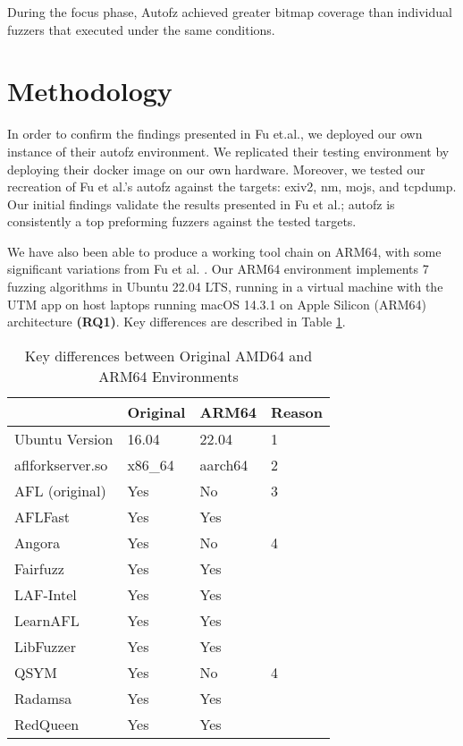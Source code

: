 During the focus phase, Autofz achieved greater bitmap coverage than individual fuzzers that executed under the same conditions.
\cite{Fu}

\section{Methodology}
In order to confirm the findings presented in Fu et.al.\cite{Fu}, we deployed our own instance of
their autofz environment. We replicated their testing environment by deploying their docker image
on our own hardware. Moreover, we tested our recreation of Fu et al.'s autofz against the targets:
exiv2, nm, mojs, and tcpdump. Our initial findings validate the results presented in Fu et al.;
autofz is consistently a top preforming fuzzers against the tested targets.

We have also been able to produce a working tool chain on ARM64, with some significant variations
from Fu et al. \cite{Fu}. Our ARM64 environment implements 7 fuzzing algorithms in
Ubuntu 22.04 LTS, running in a virtual machine with the UTM app on host laptops running
macOS 14.3.1 on Apple Silicon (ARM64) architecture \textbf{(RQ1)}. Key differences are
described in Table \ref{arm64-characteristics}.

\begin{table}[ht]
    \begin{tabular}{|l|l|l|l|}
        \hline
                        & Original\cite{Fu} & ARM64 & Reason \\
        \hline
        Ubuntu Version  & 16.04             & 22.04 & 1 \\
        \hline
        aflforkserver.so    & x86\_64           & aarch64 & 2 \\
        \hline
        AFL (original)  & Yes               & No & 3 \\
        \hline
        AFLFast         & Yes               & Yes & \\
        \hline
        Angora          & Yes               & No & 4 \\
        \hline
        Fairfuzz        & Yes               & Yes & \\
        \hline
        LAF-Intel       & Yes               & Yes & \\
        \hline
        LearnAFL        & Yes               & Yes & \\
        \hline
        LibFuzzer       & Yes               & Yes & \\
        \hline
        QSYM            & Yes               & No & 4 \\
        \hline
        Radamsa         & Yes               & Yes & \\
        \hline
        RedQueen        & Yes               & Yes & \\
        \hline
    \end{tabular}
    \caption{Key differences between Original AMD64 and ARM64 Environments}
    \label{arm64-characteristics}
\end{table}

